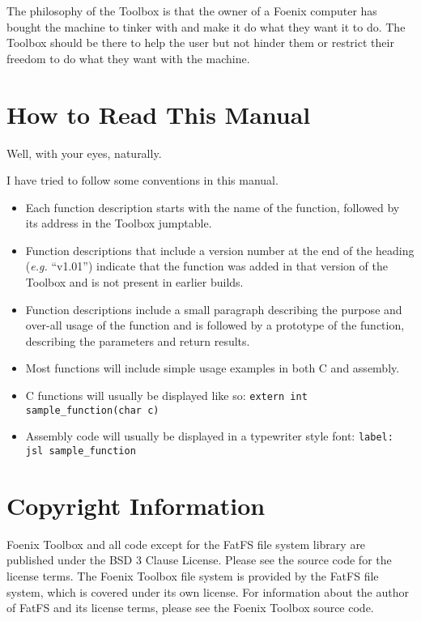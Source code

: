 The philosophy of the Toolbox is that the owner of a Foenix computer has bought the machine to tinker with and make it do what they want it to do. The Toolbox should be there to help the user but not hinder them or restrict their freedom to do what they want with the machine.

\section*{How to Read This Manual}
Well, with your eyes, naturally.

I have tried to follow some conventions in this manual.

\begin{itemize}
	\item Each function description starts with the name of the function, followed by its address in the Toolbox jumptable.
	\item Function descriptions that include a version number at the end of the heading ({\it e.g.} ``v1.01'') indicate that the function was added in that version of the Toolbox and is not present in earlier builds.
	\item Function descriptions include a small paragraph describing the purpose and over-all usage of the function and is followed by a prototype of the function, describing the parameters and return results.
	\item Most functions will include simple usage examples in both C and assembly.
	\item C functions will usually be displayed like so: \lstinline|extern int sample_function(char c)|
	\item Assembly code will usually be displayed in a typewriter style font: \verb+label: jsl sample_function+
\end{itemize}

\section*{Copyright Information}
Foenix Toolbox and all code except for the FatFS file system library are published under the BSD 3 Clause License. Please see the source code for the license terms. The Foenix Toolbox file system is provided by the FatFS file system, which is covered under its own license. For information about the author of FatFS and its license terms, please see the Foenix Toolbox source code.